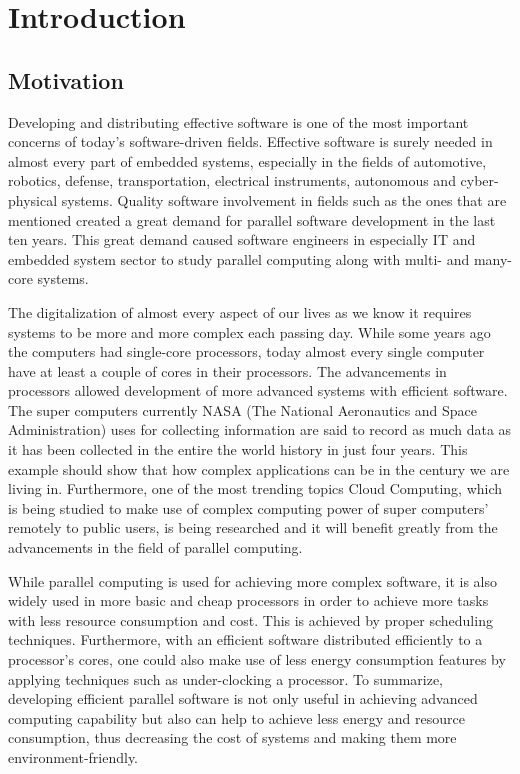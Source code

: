 
\chapter{Introduction} \label{introductionchapter}
\section{Motivation}
Developing and distributing effective software is one of the most important concerns of today's software-driven fields. Effective software is surely needed in almost every part of embedded systems, especially in the fields of automotive, robotics, defense, transportation, electrical instruments, autonomous and cyber-physical systems. Quality software involvement in fields such as the ones that are mentioned created a great demand for parallel software development in the last ten years. This great demand caused software engineers in especially IT and embedded system sector to study parallel computing along with multi- and many- core systems.

The digitalization of almost every aspect of our lives as we know it requires systems to be more and more complex each passing day. While some years ago the computers had single-core processors, today almost every single computer have at least a couple of cores in their processors. The advancements in processors allowed development of more advanced systems with efficient software. The super computers currently NASA (The National Aeronautics and Space Administration) uses for collecting information are said to record as much data as it has been collected in the entire the world history in just four years. This example should show that how complex applications can be in the century we are living in. Furthermore, one of the most trending topics Cloud Computing, which is being studied to make use of complex computing power of super computers' remotely to public users, is being researched and it will benefit greatly from the advancements in the field of parallel computing.

While parallel computing is used for achieving more complex software, it is also widely used in more basic and cheap processors in order to achieve more tasks with less resource consumption and cost. This is achieved by proper scheduling techniques. Furthermore, with an efficient software distributed efficiently to a processor's cores, one could also make use of less energy consumption features by applying techniques such as under-clocking a processor. To summarize, developing efficient parallel software is not only useful in achieving advanced computing capability but also can help to achieve less energy and resource consumption, thus decreasing the cost of systems and making them more environment-friendly.

